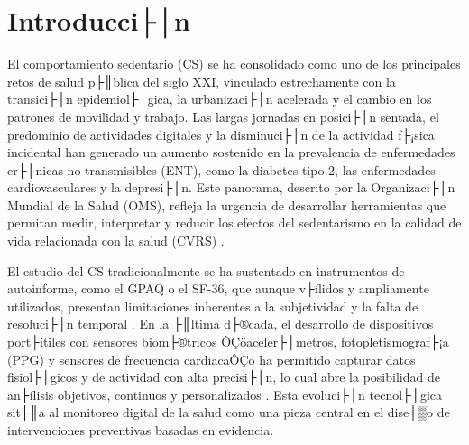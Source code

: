 ﻿%
% 

\chapter{Introducci├│n}
\label{cap:introduccion}

%

\noindent El comportamiento sedentario (CS) se ha consolidado como uno de los principales retos de salud p├║blica del siglo XXI, vinculado estrechamente con la transici├│n epidemiol├│gica, la urbanizaci├│n acelerada y el cambio en los patrones de movilidad y trabajo. Las largas jornadas en posici├│n sentada, el predominio de actividades digitales y la disminuci├│n de la actividad f├¡sica incidental han generado un aumento sostenido en la prevalencia de enfermedades cr├│nicas no transmisibles (ENT), como la diabetes tipo 2, las enfermedades cardiovasculares y la depresi├│n. Este panorama, descrito por la Organizaci├│n Mundial de la Salud (OMS), refleja la urgencia de desarrollar herramientas que permitan medir, interpretar y reducir los efectos del sedentarismo en la calidad de vida relacionada con la salud (CVRS) \cite{WHO2020,Bull2020,Guthold2020}.

El estudio del CS tradicionalmente se ha sustentado en instrumentos de autoinforme, como el GPAQ o el SF-36, que aunque v├ílidos y ampliamente utilizados, presentan limitaciones inherentes a la subjetividad y la falta de resoluci├│n temporal \cite{Romero2022,ShamahLevy2023}. En la ├║ltima d├®cada, el desarrollo de dispositivos port├ítiles con sensores biom├®tricos ÔÇöaceler├│metros, fotopletismograf├¡a (PPG) y sensores de frecuencia cardiacaÔÇö ha permitido capturar datos fisiol├│gicos y de actividad con alta precisi├│n, lo cual abre la posibilidad de an├ílisis objetivos, continuos y personalizados \cite{Henriksen2018,White2019,Strain2020}. Esta evoluci├│n tecnol├│gica sit├║a al monitoreo digital de la salud como una pieza central en el dise├▒o de intervenciones preventivas basadas en evidencia.


